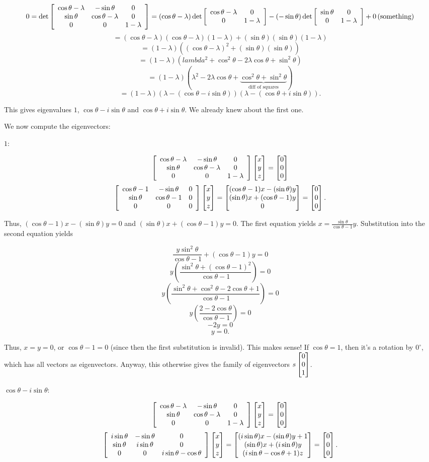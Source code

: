 \documentclass[../key.tex]{subfiles}
\begin{document}
$$0=\det \left[\begin{array}{ccc} \cos\theta - \lambda & -\sin\theta & 0 \\ \sin\theta & \cos\theta- \lambda & 0 \\ 0 & 0 & 1- \lambda \end{array}\right] = (\cos\theta- \lambda) \det \left[\begin{array}{cc} \cos\theta- \lambda & 0 \\ 0 & 1- \lambda \end{array}\right] - (-\sin\theta)\det \left[\begin{array}{cc} \sin\theta & 0 \\ 0 & 1-\lambda \end{array}\right] + 0\left(\text{something}\right)$$
$$=(\cos\theta-\lambda)(\cos\theta-\lambda)(1-\lambda) + (\sin\theta)(\sin\theta)(1-\lambda)$$
$$=(1-\lambda)((\cos\theta-\lambda)^2+(\sin\theta)(\sin\theta))$$
$$=(1-\lambda)(lambda^2 + \cos^2\theta - 2\lambda\cos\theta + \sin^2\theta)$$
$$=(1-\lambda)(\lambda^2-2\lambda\cos\theta+\underbrace{\cos^2\theta+\sin^2\theta}_{\text{diff of squares}})$$
$$=(1-\lambda)(\lambda-(\cos \theta - i\sin\theta))(\lambda - (\cos\theta + i\sin\theta)).$$

This gives eigenvalues $1$, $\cos \theta - i\sin\theta$ and $\cos\theta + i\sin\theta$. We already knew about the first one.

We now compute the eigenvectors:

$1$:

$$\left[\begin{array}{ccc} \cos\theta - \lambda & -\sin\theta & 0 \\ \sin\theta & \cos\theta- \lambda & 0 \\ 0 & 0 & 1- \lambda \end{array}\right]\begin{bmatrix} x \\ y \\ z \end{bmatrix} = \begin{bmatrix} 0 \\ 0 \\ 0 \end{bmatrix}$$
$$\left[\begin{array}{ccc} \cos\theta - 1 & -\sin\theta & 0 \\ \sin\theta & \cos\theta- 1 & 0 \\ 0 & 0 & 0 \end{array}\right]\begin{bmatrix} x \\ y \\ z \end{bmatrix} = \begin{bmatrix} (\cos\theta-1)x-(\sin\theta)y \\ (\sin\theta)x+(\cos\theta-1)y \\ 0 \end{bmatrix} = \begin{bmatrix} 0 \\ 0 \\ 0 \end{bmatrix}.$$

Thus, $(\cos\theta-1)x-(\sin\theta)y=0$ and $(\sin\theta)x + (\cos\theta-1)y=0$. The first equation yields $x=\frac{\sin\theta}{\cos\theta - 1}y$. Substitution into the second equation yields

$$\frac{y\sin^2\theta}{\cos\theta - 1} + (\cos\theta - 1)y = 0$$
$$y\left(\frac{\sin^2 \theta + (\cos\theta - 1)^2}{\cos\theta-1}\right) = 0$$
$$y\left(\frac{\sin^2 \theta + \cos^2\theta - 2\cos\theta + 1}{\cos\theta - 1}\right) = 0$$
$$y\left(\frac{2-2\cos\theta}{\cos\theta-1}\right)=0$$
$$-2y=0$$
$$y=0.$$

Thus, $x=y=0$, or $\cos\theta-1 = 0$ (since then the first substitution is invalid). This makes sense! If $\cos\theta=1$, then it's a rotation by $0^\circ$, which has all vectors as eigenvectors. Anyway, this otherwise gives the family of eigenvectors $s\begin{bmatrix} 0 \\ 0 \\ 1 \end{bmatrix}$.

$\cos\theta - i\sin\theta$:

$$\left[\begin{array}{ccc} \cos\theta - \lambda & -\sin\theta & 0 \\ \sin\theta & \cos\theta- \lambda & 0 \\ 0 & 0 & 1- \lambda \end{array}\right]\begin{bmatrix} x \\ y \\ z \end{bmatrix} = \begin{bmatrix} 0 \\ 0 \\ 0 \end{bmatrix}$$
$$\left[\begin{array}{ccc} i\sin\theta & -\sin\theta & 0 \\ \sin\theta & i\sin\theta & 0 \\ 0 & 0 & i\sin\theta - \cos\theta \end{array}\right]\begin{bmatrix} x \\ y \\ z \end{bmatrix}=\begin{bmatrix} (i\sin\theta)x-(\sin\theta)y+1 \\ (\sin\theta)x+(i\sin\theta)y \\ (i\sin\theta - \cos\theta+1)z \end{bmatrix} =\begin{bmatrix} 0 \\ 0 \\ 0 \end{bmatrix}.$$
\end{document}
